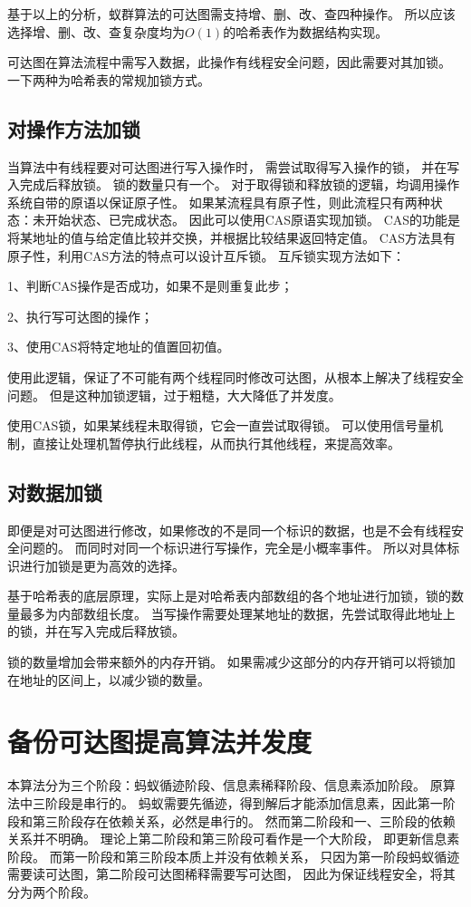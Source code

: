基于以上的分析，蚁群算法的可达图需支持增、删、改、查四种操作。
所以应该选择增、删、改、查复杂度均为$O(1)$的哈希表作为数据结构实现。

可达图在算法流程中需写入数据，此操作有线程安全问题，因此需要对其加锁。
一下两种为哈希表的常规加锁方式。
\subsection{对操作方法加锁}
当算法中有线程要对可达图进行写入操作时，
需尝试取得写入操作的锁，
并在写入完成后释放锁。
锁的数量只有一个。
对于取得锁和释放锁的逻辑，均调用操作系统自带的原语以保证原子性。
如果某流程具有原子性，则此流程只有两种状态：未开始状态、已完成状态。
因此可以使用CAS原语实现加锁。
CAS的功能是将某地址的值与给定值比较并交换，并根据比较结果返回特定值。
CAS方法具有原子性，利用CAS方法的特点可以设计互斥锁。
互斥锁实现方法如下：

1、判断CAS操作是否成功，如果不是则重复此步；

2、执行写可达图的操作；

3、使用CAS将特定地址的值置回初值。


使用此逻辑，保证了不可能有两个线程同时修改可达图，从根本上解决了线程安全问题。
但是这种加锁逻辑，过于粗糙，大大降低了并发度。

使用CAS锁，如果某线程未取得锁，它会一直尝试取得锁。
可以使用信号量机制，直接让处理机暂停执行此线程，从而执行其他线程，来提高效率。
\subsection{对数据加锁}
即便是对可达图进行修改，如果修改的不是同一个标识的数据，也是不会有线程安全问题的。
而同时对同一个标识进行写操作，完全是小概率事件。
所以对具体标识进行加锁是更为高效的选择。

基于哈希表的底层原理，实际上是对哈希表内部数组的各个地址进行加锁，锁的数量最多为内部数组长度。
当写操作需要处理某地址的数据，先尝试取得此地址上的锁，并在写入完成后释放锁。

锁的数量增加会带来额外的内存开销。
如果需减少这部分的内存开销可以将锁加在地址的区间上，以减少锁的数量。
\section{备份可达图提高算法并发度}
本算法分为三个阶段：蚂蚁循迹阶段、信息素稀释阶段、信息素添加阶段。
原算法中三阶段是串行的。
蚂蚁需要先循迹，得到解后才能添加信息素，因此第一阶段和第三阶段存在依赖关系，必然是串行的。
然而第二阶段和一、三阶段的依赖关系并不明确。
理论上第二阶段和第三阶段可看作是一个大阶段，
即更新信息素阶段。
而第一阶段和第三阶段本质上并没有依赖关系，
只因为第一阶段蚂蚁循迹需要读可达图，第二阶段可达图稀释需要写可达图，
因此为保证线程安全，将其分为两个阶段。


